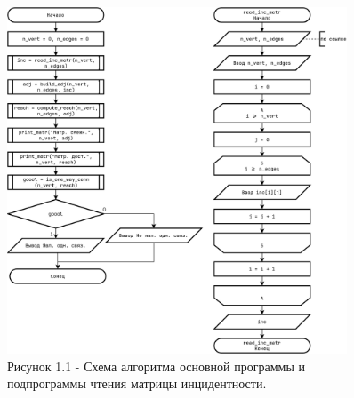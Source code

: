 \documentclass[oneside,a4paper,14pt]{extarticle}
\begin{document}
\clearpage
\begin{figure}[H]
	\centering
	\includegraphics[width=0.9\textwidth]{pics/flowchart1.png}
	\caption*{Рисунок 1.1 - Схема алгоритма основной программы и подпрограммы чтения матрицы инцидентности.}
\end{figure}
\end{document}
